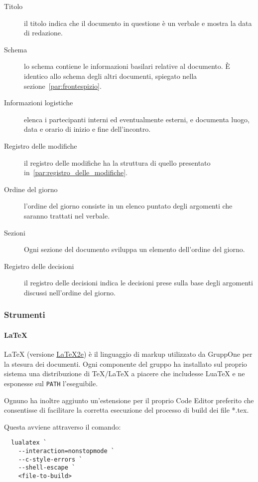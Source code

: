 \documentclass[../../norme-di-progetto.tex]{subfiles}
\begin{document}
\begin{description}
  \item [Titolo] il titolo indica che il documento in questione è un verbale e mostra la data di redazione.
  \item [Schema] lo schema contiene le informazioni basilari relative al documento. È identico allo schema degli altri documenti, spiegato nella sezione~\ref{par:frontespizio}.
  \item [Informazioni logistiche] elenca i partecipanti interni ed eventualmente esterni, e documenta luogo, data e orario di inizio e fine dell'incontro.
  \item [Registro delle modifiche] il registro delle modifiche ha la struttura di quello presentato in~\ref{par:registro_delle_modifiche}.
  \item [Ordine del giorno] l'ordine del giorno consiste in un elenco puntato degli argomenti che saranno trattati nel verbale.
  \item [Sezioni] Ogni sezione del documento sviluppa un elemento dell'ordine del giorno.
  \item [Registro delle decisioni] il registro delle decisioni indica le decisioni prese sulla base degli argomenti discussi nell'ordine del giorno.
\end{description}

\subsubsection{Strumenti}

\paragraph{\LaTeX}%
\label{par:LaTeX}
\LaTeX{} (versione \href{https://texfaq.org/FAQ-latex2e}{\LaTeX2e}) è il linguaggio di markup utilizzato da GruppOne per la stesura dei documenti.
Ogni componente del gruppo ha installato sul proprio sistema una distribuzione di \TeX{}/\LaTeX{} a piacere che includesse Lua\TeX{} e ne esponesse sul \verb|PATH| l'eseguibile.

Ognuno ha inoltre aggiunto un'estensione per il proprio Code Editor preferito che consentisse di facilitare la corretta esecuzione del processo di build dei file *.tex.

Questa avviene attraverso il comando:

\begin{verbatim}
  lualatex `
    --interaction=nonstopmode `
    --c-style-errors `
    --shell-escape `
    <file-to-build>
\end{verbatim}
\end{document}
